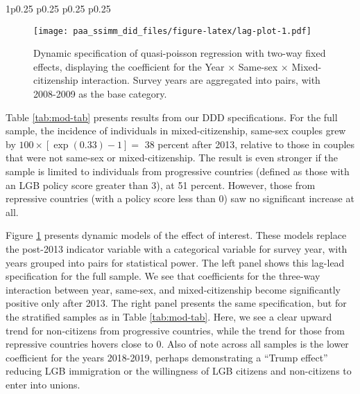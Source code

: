 \documentclass[
  12pt,
]{article}
\begin{document}
\begin{table}[ht]
\begin{centerbox}
\begin{threeparttable}
\begin{tabularx}{1\textwidth}{p{} p{} p{} p{}}
 \tabularnewline[-0.5pt]


\hhline{}
\end{tabularx}
\end{threeparttable}\par\end{centerbox}

\end{table}
 

\begin{figure}
\centering
\texttt{[image: paa\_ssimm\_did\_files/figure-latex/lag-plot-1.pdf]}
\caption{\label{fig:lag-plot}Dynamic specification of quasi-poisson regression with two-way fixed effects, displaying the coefficient for the Year × Same-sex × Mixed-citizenship interaction. Survey years are aggregated into pairs, with 2008-2009 as the base category.}
\end{figure}

Table \ref{tab:mod-tab} presents results from our DDD specifications. For the full sample, the incidence of individuals in mixed-citizenship, same-sex couples grew by \(100 \times [\exp(0.33) -1] =\) 38 percent after 2013, relative to those in couples that were not same-sex or mixed-citizenship. The result is even stronger if the sample is limited to individuals from progressive countries (defined as those with an LGB policy score greater than 3), at 51 percent. However, those from repressive countries (with a policy score less than 0) saw no significant increase at all.

Figure \ref{fig:lag-plot} presents dynamic models of the effect of interest. These models replace the post-2013 indicator variable with a categorical variable for survey year, with years grouped into pairs for statistical power. The left panel shows this lag-lead specification for the full sample. We see that coefficients for the three-way interaction between year, same-sex, and mixed-citizenship become significantly positive only after 2013. The right panel presents the same specification, but for the stratified samples as in Table \ref{tab:mod-tab}. Here, we see a clear upward trend for non-citizens from progressive countries, while the trend for those from repressive countries hovers close to 0. Also of note across all samples is the lower coefficient for the years 2018-2019, perhaps demonstrating a ``Trump effect'' reducing LGB immigration or the willingness of LGB citizens and non-citizens to enter into unions.
\end{document}
